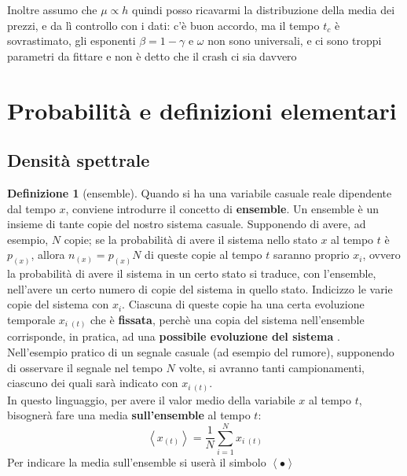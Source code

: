\documentclass[a4paper,12pt]{article}
\renewcommand{\arg}[1]{_{(#1)}}
\theoremstyle{plain}
\theoremstyle{definition}
\newtheorem{defn}{Definizione}[section]
\newcommand{\f}[2]{\frac{#1}{#2}}
\newcommand{\ave}[1]{\left\langle#1\right\rangle }
\theoremstyle{remark}
\begin{document}
Inoltre assumo che $\mu\propto h$ quindi posso ricavarmi la distribuzione della media dei prezzi, e da lì controllo con i dati: c'è buon accordo, ma il tempo $t_c$ è  sovrastimato, gli esponenti $\beta=1-\gamma$ e $\omega$ non sono universali, e ci sono troppi parametri da fittare e non è detto che il crash ci sia davvero












\appendix
\section{Probabilità e definizioni elementari}
	\subsection{Densità spettrale}
\begin{defn}[ensemble]
	Quando si ha una variabile casuale reale dipendente dal tempo $x$, conviene introdurre il concetto di \textbf{ensemble}. Un ensemble è un insieme di tante copie del nostro sistema casuale. Supponendo di avere, ad esempio, $N$ copie; se la probabilità di avere il sistema nello stato $x$ al tempo $t$ è $p_{(x)}$, allora $n_{(x)}=p\arg{x} N$ di queste copie al tempo $t$ saranno proprio $x_i$, ovvero la probabilità di avere il sistema in un certo stato si traduce, con l'ensemble, nell'avere un certo numero di copie del sistema in quello stato. Indicizzo le varie copie del sistema con $x_i$. Ciascuna di queste copie ha una certa evoluzione temporale $x_{i\;(t)}$  che è \textbf{fissata}, perchè una copia del sistema nell'ensemble corrisponde, in pratica, ad una \textbf{possibile evoluzione del sistema }.\\
	Nell'esempio pratico di un segnale casuale (ad esempio del rumore), supponendo di osservare il segnale nel tempo $N$ volte, si avranno tanti campionamenti, ciascuno dei quali sarà indicato con $x_{i\:(t)}$. 
	\\In questo linguaggio, per avere il valor medio della variabile $x$ al tempo $t$, bisognerà fare una media \textbf{sull'ensemble} al tempo $t$:
	\[\ave{x\arg{t}}=\f{1}{N}\sum_{i=1}^{N} x_{i\:(t)}\]
	Per indicare la media sull'ensemble si userà il simbolo $\ave{\bullet}$
\end{defn}
\end{document}
